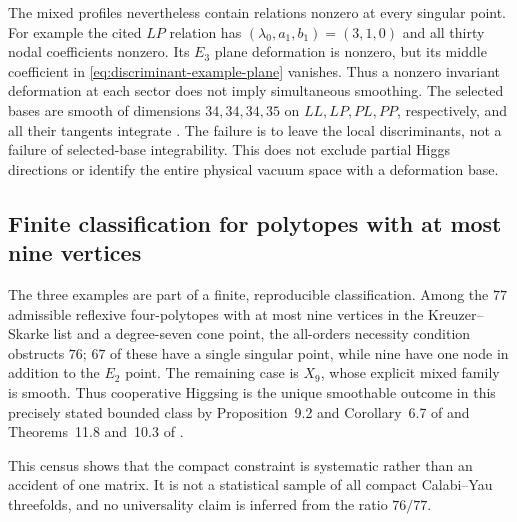 The mixed profiles nevertheless contain relations nonzero at every
singular point. For example the cited $LP$ relation has
$(\lambda_0,a_1,b_1)=(3,1,0)$ and all thirty nodal coefficients nonzero.
Its $E_3$ plane deformation is nonzero, but its middle coefficient in
\eqref{eq:discriminant-example-plane} vanishes. Thus a nonzero invariant
deformation at each sector does not imply simultaneous smoothing.
The selected bases are smooth of dimensions $34,34,34,35$ on
$LL,LP,PL,PP$, respectively, and all their tangents integrate
\cite[Section~5.3]{Wuebben:2026smoothing}. The failure is to leave the
local discriminants, not a failure of selected-base integrability. This
does not exclude partial Higgs directions or identify the entire physical
vacuum space with a deformation base.

\subsection{Finite classification for polytopes with at most nine vertices}
\label{subsec:census}

The three examples are part of a finite, reproducible classification. Among
the $77$ admissible reflexive four-polytopes with at most nine vertices in
the Kreuzer--Skarke list \cite{Kreuzer:2000} and a degree-seven cone point,
the all-orders necessity condition obstructs $76$;
$67$ of these have a single singular point, while nine have one node in
addition to the $E_2$ point. The remaining case is $X_9$, whose explicit mixed
family is smooth. Thus cooperative Higgsing is
the unique smoothable outcome in this precisely stated bounded class
by Proposition~9.2 and Corollary~6.7 of \cite{Wuebben:2026obstruction} and
Theorems~11.8 and~10.3 of \cite{Wuebben:2026smoothing}.

This census shows that the compact constraint is systematic rather than an
accident of one matrix. It is not a statistical sample of all compact
Calabi--Yau threefolds, and no universality claim is inferred from the ratio
$76/77$.
